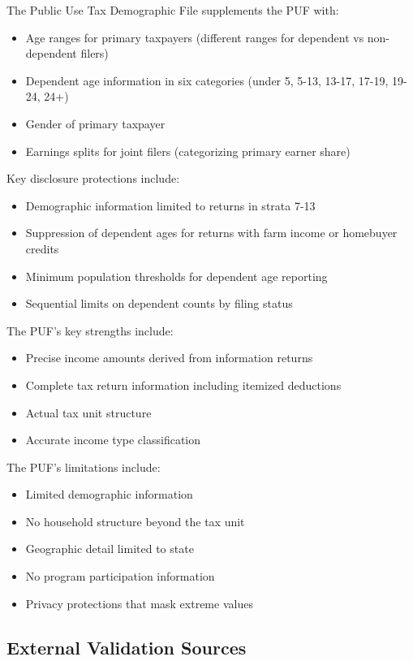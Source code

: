 The Public Use Tax Demographic File supplements the PUF with:
\begin{itemize}
    \item Age ranges for primary taxpayers (different ranges for dependent vs non-dependent filers)
    \item Dependent age information in six categories (under 5, 5-13, 13-17, 17-19, 19-24, 24+)
    \item Gender of primary taxpayer
    \item Earnings splits for joint filers (categorizing primary earner share)
\end{itemize}

Key disclosure protections include:
\begin{itemize}
    \item Demographic information limited to returns in strata 7-13
    \item Suppression of dependent ages for returns with farm income or homebuyer credits
    \item Minimum population thresholds for dependent age reporting
    \item Sequential limits on dependent counts by filing status
\end{itemize}

The PUF's key strengths include:
\begin{itemize}
    \item Precise income amounts derived from information returns
    \item Complete tax return information including itemized deductions
    \item Actual tax unit structure
    \item Accurate income type classification
\end{itemize}

The PUF's limitations include:
\begin{itemize}
    \item Limited demographic information
    \item No household structure beyond the tax unit
    \item Geographic detail limited to state
    \item No program participation information
    \item Privacy protections that mask extreme values
\end{itemize}

\subsection{External Validation Sources}

